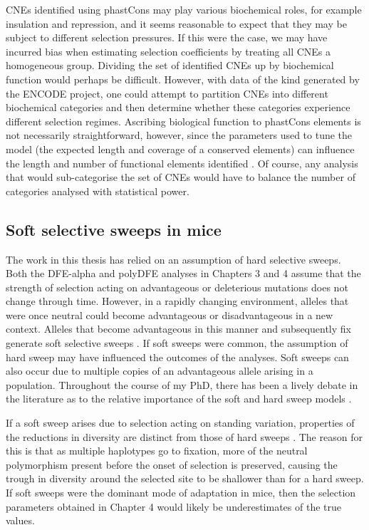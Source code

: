 	CNEs identified using phastCons \citep{RN353} may play various biochemical roles, for example insulation and repression, and it seems reasonable to expect that they may be subject to different selection pressures. If this were the case, we may have incurred bias when estimating selection coefficients by treating all CNEs a homogeneous group. Dividing the set of identified CNEs up by biochemical function would perhaps be difficult. However, with data of the kind generated by the ENCODE project, one could attempt to partition CNEs into different biochemical categories and then determine whether these categories experience different selection regimes. Ascribing biological function to phastCons elements is not necessarily straightforward, however, since the parameters used to tune the model (the expected length and coverage of a conserved elements) can influence the length and number of functional elements identified \citep{RN376}. Of course, any analysis that would sub-categorise the set of CNEs would have to balance the number of categories analysed with statistical power.
	
 \subsection{Soft selective sweeps in mice}

	The work in this thesis has relied on an assumption of hard selective sweeps. Both the DFE-alpha and polyDFE analyses in Chapters 3 and 4 assume that the strength of selection acting on advantageous or deleterious mutations does not change through time. However, in a rapidly changing environment, alleles that were once neutral could become advantageous or disadvantageous in a new context. Alleles that become advantageous in this manner and subsequently fix generate soft selective sweeps \citep{RN336}. If soft sweeps were common, the assumption of hard sweep may have influenced the outcomes of the analyses. Soft sweeps can also occur due to multiple copies of an advantageous allele arising in a population. Throughout the course of my PhD, there has been a lively debate in the literature as to the  relative importance of the soft and hard sweep models \citep{RN153, RN336}.

	If a soft sweep arises due to selection acting on standing variation, properties of the reductions in diversity are distinct from those of hard sweeps \citep{RN336}. The reason for this is that as multiple haplotypes go to fixation, more of the neutral polymorphism present before the onset of selection is preserved, causing the trough in diversity around the selected site to be shallower than for a hard sweep. If soft sweeps were the dominant mode of adaptation in mice, then the selection parameters obtained in Chapter 4 would likely be underestimates of the true values. 
	

